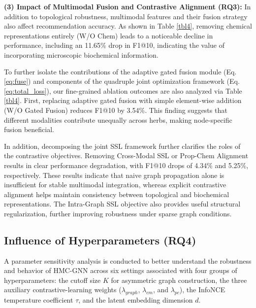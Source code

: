 \documentclass[a4paper,fleqn]{cas-dc}
\begin{document}
\textbf{(3) Impact of Multimodal Fusion and Contrastive Alignment (RQ3):}
In addition to topological robustness, multimodal features and their fusion strategy also affect recommendation accuracy. As shown in Table \ref{tbl4}, removing chemical representations entirely (W/O Chem) leads to a noticeable decline in performance, including an 11.65\% drop in F1@10, indicating the value of incorporating microscopic biochemical information.

To further isolate the contributions of the adaptive gated fusion module (Eq. \ref{eq:fuse}) and components of the quadruple joint optimization framework (Eq. \ref{eq:total_loss}), our fine-grained ablation outcomes are also analyzed via Table \ref{tbl4}. First, replacing adaptive gated fusion with simple element-wise addition (W/O Gated Fusion) reduces F1@10 by 3.54\%. This finding suggests that different modalities contribute unequally across herbs, making node-specific fusion beneficial.

In addition, decomposing the joint SSL framework further clarifies the roles of the contrastive objectives. Removing Cross-Modal SSL or Prop-Chem Alignment results in clear performance degradation, with F1@10 drops of 4.34\% and 5.25\%, respectively. These results indicate that naive graph propagation alone is insufficient for stable multimodal integration, whereas explicit contrastive alignment helps maintain consistency between topological and biochemical representations. The Intra-Graph SSL objective also provides useful structural regularization, further improving robustness under sparse graph conditions.

\subsection{Influence of Hyperparameters (RQ4)}

A parameter sensitivity analysis is conducted to better understand the robustness and behavior of HMC-GNN across six settings associated with four groups of hyperparameters: the cutoff size $K$ for asymmetric graph construction, the three auxiliary contrastive-learning weights ($\lambda_{graph}$, $\lambda_{cm}$, and $\lambda_{pc}$), the InfoNCE temperature coefficient $\tau$, and the latent embedding dimension $d$.
\end{document}
